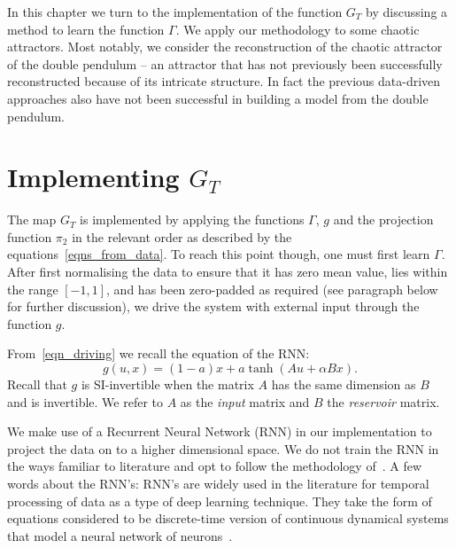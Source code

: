 In this chapter we turn to the implementation of the function $G_T$ by discussing a method to learn the function $\Gamma$. We apply our methodology to some chaotic attractors. 
Most notably, we consider the reconstruction of the chaotic attractor of the double pendulum -- an  attractor that has not previously been successfully reconstructed because of its intricate structure. 
In fact the previous data-driven approaches also have not been successful in building a model from the double pendulum. 


\section{Implementing $G_T$}
The map $G_T$ is implemented by applying the functions $\Gamma$, $g$ and the projection function $\pi_2$ in the relevant order as described by the equations~\eqref{eqns_from_data}. To reach this point though, one must first learn $\Gamma$.
After first normalising the data to ensure that it has zero mean value, lies within the range $[-1,1]$, and has been zero-padded as required (see paragraph below for further discussion), we drive the system with external input through the function $g$.

From~\eqref{eqn_driving} we recall the equation of the RNN: \[g(u,x) = (1-a) x + a \tanh(Au + \alpha B x).\]
Recall that $g$ is SI-invertible when the matrix $A$ has the same dimension as $B$ and is invertible. We refer to $A$ as the \textit{input} matrix and $B$ the \textit{reservoir} matrix. 

We make use of a Recurrent Neural Network (RNN) in our implementation to project the data on to a higher dimensional space. We do not train the RNN in the ways familiar to literature and opt to follow the methodology of~\cite{manjunath2021universal}. 
A few words about the RNN's: RNN's are widely used in the literature for temporal processing of data as a type of deep learning technique. 
They take the form of equations considered to be discrete-time version of continuous dynamical systems that model a neural network of neurons~\cite{jaeger2001echo}.

